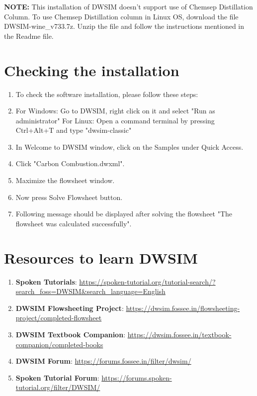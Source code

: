 \documentclass[12pt,a4paper]{article}
\begin{document}
\noindent \textbf{NOTE:} This installation of DWSIM doesn't support use of Chemsep Distillation Column. To use Chemsep Distillation column in Linux OS, download the file DWSIM-wine\_v733.7z. Unzip the file and follow the instructions mentioned in the Readme file.

\section{Checking the installation}

\begin{enumerate}

\item To check the software installation, please follow these steps:
\item For Windows: Go to DWSIM, right click on it and select "Run as administrator"
\newline For Linux: Open a command terminal by pressing Ctrl+Alt+T and type "dwsim-classic"
\item In Welcome to DWSIM window, click on the Samples under Quick Access.
\item Click "Carbon Combustion.dwxml".
\item Maximize the flowsheet window.
\item Now press Solve Flowsheet button.
\item Following message should be displayed after solving the flowsheet "The flowsheet was calculated successfully".

\end{enumerate}
\section{Resources to learn DWSIM}

\begin{enumerate}

\item \textbf{Spoken Tutorials}: \url{https://spoken-tutorial.org/tutorial-search/?search_foss=DWSIM&search_language=English}

\item \textbf{DWSIM Flowsheeting Project}: \url{https://dwsim.fossee.in/flowsheeting-project/completed-flowsheet}

\item \textbf{DWSIM Textbook Companion}: \url{https://dwsim.fossee.in/textbook-companion/completed-books}

\item \textbf{DWSIM Forum}: \url{https://forums.fossee.in/filter/dwsim/}

\item \textbf{Spoken Tutorial Forum}: \url{https://forums.spoken-tutorial.org/filter/DWSIM/}

\end{enumerate}
\end{document}
